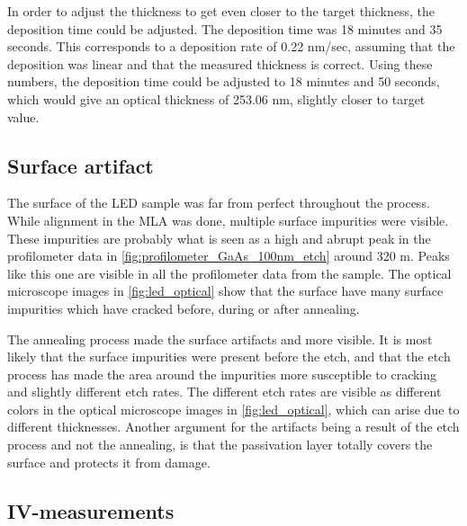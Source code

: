 In order to adjust the thickness to get even closer to the target thickness, the deposition time could be adjusted.
The deposition time was 18 minutes and 35 seconds.
This corresponds to a deposition rate of 0.22 nm/sec, assuming that the deposition was linear and that the measured thickness is correct.
Using these numbers, the deposition time could be adjusted to 18 minutes and 50 seconds, which would give an optical thickness of 253.06 nm, slightly closer to target value.





\subsection{Surface artifact}
\label{sec:discussion:surface_artifact}

\noindent The surface of the LED sample was far from perfect throughout the process.
While alignment in the MLA was done, multiple surface impurities were visible. 
These impurities are probably what is seen as a high and abrupt peak in the profilometer data in \autoref{fig:profilometer_GaAs_100nm_etch} around 320 \textmu m.
Peaks like this one are visible in all the profilometer data from the sample. 
The optical microscope images in \autoref{fig:led_optical} show that the surface have many surface impurities which have cracked before, during or after annealing. 


The annealing process made the surface artifacts and more visible.
It is most likely that the surface impurities were present before the etch, and that the etch process has made the area around the impurities more susceptible to cracking and slightly different etch rates.
The different etch rates are visible as different colors in the optical microscope images in \autoref{fig:led_optical}, which can arise due to different thicknesses. 
Another argument for the artifacts being a result of the etch process and not the annealing, is that the passivation layer totally covers the surface and protects it from damage. 

\subsection{IV-measurements}

